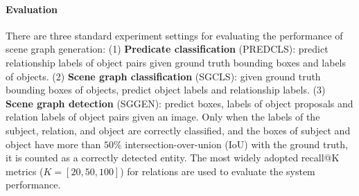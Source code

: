 \documentclass[runningheads]{llncs}
\begin{document}
\paragraph{Evaluation}
There are three standard experiment settings for evaluating the performance of scene graph generation:
(1) \textbf{Predicate classification} (PREDCLS): predict relationship labels of object pairs given ground truth bounding boxes and labels of objects.
(2) \textbf{Scene graph classification} (SGCLS):  given ground truth bounding boxes of objects, predict object labels and relationship labels. 
(3) \textbf{Scene graph detection} (SGGEN): predict boxes, labels of object proposals and relation labels of object pairs given an image.
Only when the labels of the subject, relation, and object are correctly classified, and the boxes of subject and object have more than $50\%$ intersection-over-union (IoU) with the ground truth, it is counted as a correctly detected entity.
The most widely adopted recall@K metrics ($K=[20,50,100]$) for relations are used to evaluate the system performance.
\end{document}
